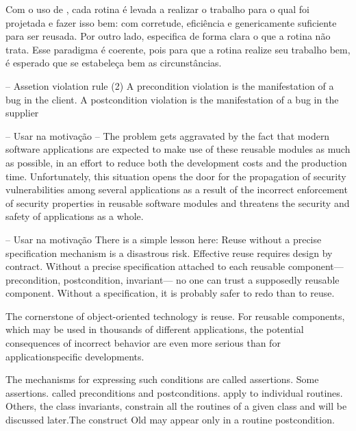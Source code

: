 Com o uso de \designbycontract{}, cada rotina é levada a realizar o trabalho
para o qual foi projetada e fazer isso bem: com corretude, eficiência e
genericamente suficiente para ser reusada. Por outro lado, especifica de forma
clara o que a rotina não trata. Esse paradigma é coerente, pois para que a
rotina realize seu trabalho bem, é esperado que se estabeleça bem as
circunstâncias.








-- Assetion violation rule (2)
A precondition violation is the manifestation of a bug in the client.
A postcondition violation is the manifestation of a bug in the supplier






-- Usar na motivação --
The problem gets aggravated by
the fact that modern software applications are expected to
make use of these reusable modules as much as possible,
in an effort to reduce both the development costs and the
production time. Unfortunately, this situation opens the door
for the propagation of security vulnerabilities among several
applications as a result of the incorrect enforcement of security
properties in reusable software modules and threatens the
security and safety of applications as a whole.
\cite{rubio2013verifying}


-- Usar na motivação
There is a simple lesson here: Reuse without a precise specification
mechanism is a disastrous risk.
Effective reuse requires design by contract.
Without a precise specification attached to each reusable component—
precondition, postcondition, invariant— no one can trust a supposedly reusable
component. Without a specification, it is probably safer to redo than to reuse.
\cite{jazequel1997design}



The cornerstone of object-oriented technology is reuse. For reusable components,
which may be used in thousands of different applications, the potential
consequences of incorrect behavior are even more serious than for applicationspecific
developments.

The mechanisms for expressing such conditions are called assertions. Some
assertions.
called preconditions and postconditions.
apply to individual routines. Others, the class invariants, constrain all the
routines of a given class and will be discussed later.The construct Old may
appear only in a routine postcondition.

